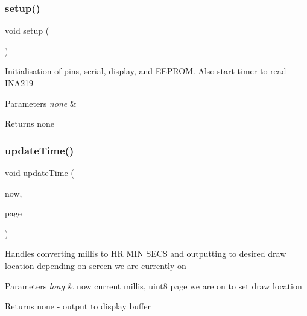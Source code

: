 \subsubsection{\texorpdfstring{setup()}{setup()}}
{\footnotesize\ttfamily void setup (\begin{DoxyParamCaption}{ }\end{DoxyParamCaption})}

Initialisation of pins, serial, display, and E\+E\+P\+R\+OM. Also start timer to read I\+N\+A219


\begin{DoxyParams}{Parameters}
{\em none} & \\
\hline
\end{DoxyParams}
\begin{DoxyReturn}{Returns}
none 
\end{DoxyReturn}
\hypertarget{_u_s_b___tester___o_l_e_d__128x64___beta__2_82_8ino_ad18e0fc055b84b24dfaf45eaf3680d43}{}\label{_u_s_b___tester___o_l_e_d__128x64___beta__2_82_8ino_ad18e0fc055b84b24dfaf45eaf3680d43} 
\subsubsection{\texorpdfstring{update\+Time()}{updateTime()}}
{\footnotesize\ttfamily void update\+Time (\begin{DoxyParamCaption}\item[{long}]{now,  }\item[{uint8\+\_\+t}]{page }\end{DoxyParamCaption})}

Handles converting millis to HR M\+IN S\+E\+CS and outputting to desired draw location depending on screen we are currently on


\begin{DoxyParams}{Parameters}
{\em long} & now current millis, uint8 page we are on to set draw location \\
\hline
\end{DoxyParams}
\begin{DoxyReturn}{Returns}
none -\/ output to display buffer 
\end{DoxyReturn}


